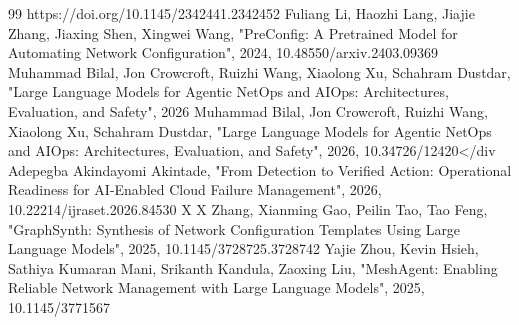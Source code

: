 \documentclass[conference]{IEEEtran}
\begin{document}
\begin{thebibliography}{99}
 https://doi.org/10.1145/2342441.2342452
 Fuliang Li, Haozhi Lang, Jiajie Zhang, Jiaxing Shen, Xingwei Wang, "PreConfig: A Pretrained Model for Automating Network Configuration", 2024, 10.48550/arxiv.2403.09369
 Muhammad Bilal, Jon Crowcroft, Ruizhi Wang, Xiaolong Xu, Schahram Dustdar, "Large Language Models for Agentic NetOps and AIOps: Architectures, Evaluation, and Safety", 2026
 Muhammad Bilal, Jon Crowcroft, Ruizhi Wang, Xiaolong Xu, Schahram Dustdar, "Large Language Models for Agentic NetOps and AIOps: Architectures, Evaluation, and Safety", 2026, 10.34726/12420</div
 Adepegba Akindayomi Akintade, "From Detection to Verified Action: Operational Readiness for AI-Enabled Cloud Failure Management", 2026, 10.22214/ijraset.2026.84530
 X X Zhang, Xianming Gao, Peilin Tao, Tao Feng, "GraphSynth: Synthesis of Network Configuration Templates Using Large Language Models", 2025, 10.1145/3728725.3728742
 Yajie Zhou, Kevin Hsieh, Sathiya Kumaran Mani, Srikanth Kandula, Zaoxing Liu, "MeshAgent: Enabling Reliable Network Management with Large Language Models", 2025, 10.1145/3771567
\end{thebibliography}
\end{document}
